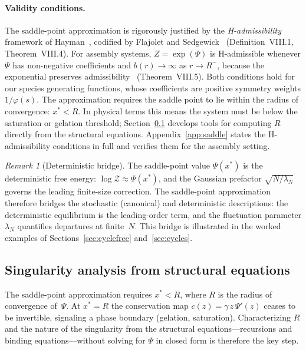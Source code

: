 \documentclass[11pt]{amsart}
\newcommand{\GFensemble}{Z}
\newcommand{\GFcomb}{\Psi}
\theoremstyle{definition}
\theoremstyle{plain}
\theoremstyle{remark}
\newtheorem*{remark}{Remark}
\begin{document}
\paragraph{Validity conditions.}
The saddle-point approximation is rigorously justified by the \emph{H-admissibility} framework of Hayman~\cite{hayman1956generalisation}, codified by Flajolet and Sedgewick~\cite{flajolet2009analytic} (Definition~VIII.1, Theorem~VIII.4).
For assembly systems, $\GFensemble = \exp(\GFcomb)$ is H-admissible whenever $\GFcomb$ has non-negative coefficients and $b(r)\to\infty$ as $r\to R^-$, because the exponential preserves admissibility~\cite{flajolet2009analytic} (Theorem~VIII.5).
Both conditions hold for our species generating functions, whose coefficients are positive symmetry weights $1/\varphi(s)$.
The approximation requires the saddle point to lie within the radius of convergence: $x^*<R$.
In physical terms this means the system must be below the saturation or gelation threshold; Section~\ref{sec:singularity} develops tools for computing $R$ directly from the structural equations.
Appendix~\ref{app:saddle} states the H-admissibility conditions in full and verifies them for the assembly setting.

\begin{remark}[Deterministic bridge]
The saddle-point value $\GFcomb(x^*)$ is the deterministic free energy: $\log\mathcal{Z}\approx \GFcomb(x^*)$, and the Gaussian prefactor $\sqrt{N/\lambda_N}$ governs the leading finite-size correction.
The saddle-point approximation therefore bridges the stochastic (canonical) and deterministic descriptions: the deterministic equilibrium is the leading-order term, and the fluctuation parameter $\lambda_N$ quantifies departures at finite~$N$.
This bridge is illustrated in the worked examples of Sections~\ref{sec:cyclefree} and~\ref{sec:cycles}.
\end{remark}


\subsection{Singularity analysis from structural equations}
\label{sec:singularity}

The saddle-point approximation requires $x^*<R$, where $R$ is the radius of convergence of~$\GFcomb$.
At $x^*=R$ the conservation map $c(z)=\gamma\,z\,\GFcomb'(z)$ ceases to be invertible, signaling a phase boundary (gelation, saturation).
Characterizing $R$ and the nature of the singularity from the structural equations---recursions and binding equations---without solving for $\GFcomb$ in closed form is therefore the key step.
\end{document}
